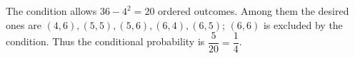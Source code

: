 The condition allows $36-4^2=20$ ordered outcomes. Among them the desired ones are $(4,6),(5,5),(5,6),(6,4),(6,5)$; $(6,6)$ is excluded by the condition. Thus the conditional probability is $\boxed{\dfrac{5}{20}=\dfrac{1}{4}}$.

